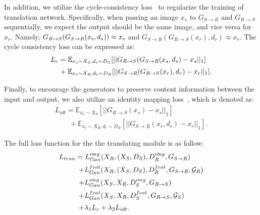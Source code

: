 \documentclass[10pt,twocolumn,letterpaper]{article}
\begin{document}
In addition, we utilize the cycle-consistency loss~\cite{zhu2017unpaired} to regularize the training of translation network. 
Specifically, when passing an image ${x_s}$ to ${G_{S \to R}}$ and ${G_{R \to S}}$ sequentially, we expect the output should be the same image, and vice versa for ${x_r}$.
Namely, ${G_{R \to S}}({G_{S \to R}}({x_{\rm{s}}},{d_s})) \approx {x_{\rm{s}}}$ and ${G_{S \to R}}({G_{R \to S}}({x_r}),{d_r}) \approx {x_r}$.  
The cycle consistency loss can be expressed as:
\begin{equation}
\label{eqn:L_c}
    \begin{array}{l}
{L_c}  = {\mathbb{E}_{{x_s} \sim {X_S},{d_s} \sim {D_S}}}[||{G_{R \to S}}({G_{S \to R}}({x_s},{d_s}) - {x_s}|{|_1}]\\ [1.8mm]
\quad \, {\rm{    }} + {\mathbb{E}_{{x_r} \sim {X_R},{d_r} \sim {D_R}}}[||{G_{S \to R}}({G_{R \to S}}({x_r}),{d_r}) - {x_r}|{|_1}].
\end{array}
\end{equation}


Finally, to encourage the generators to preserve content information between the input and output, we also utilize an identity mapping loss~\cite{zhu2017unpaired}, which is denoted as:
\begin{equation}
\label{eqn:L_i}
    \begin{array}{l}
{L_{idt}} = {\mathbb{E}_{{x_s} \sim {X_S}}}[||{G_{R \to S}}({x_s}) - {x_s}|{|_1}]\\[1.8mm]
 \quad \quad  + {\mathbb{E}_{{x_r} \sim {X_R},{d_r} \sim {D_R}}}[||{G_{S \to R}}({x_r},{d_r}) - {x_r}|{|_1}].
\end{array}
\end{equation}


The full loss function for the the translating module is as follow:
\begin{equation}
\label{eqn:Loss_trans}
    \begin{array}{l}
{L_{tran}} = L_{Gan}^{img}({X_R},({X_S},{D_S}),D_R^{img},{G_{S \to R}})\\[1.8mm]
 \quad  \quad  \ \ \, + L_{Gan}^{feat}({X_R},({X_S},{D_S}),D_R^{feat},{G_{S \to R}},{{\cal G}_{R}})\\[1.8mm]
 \quad  \quad  \ \ \, + L_{Gan}^{img}({X_S},{X_R},D_S^{img},{G_{R \to S}})\\[1.8mm]
 \quad  \quad  \ \ \, + L_{Gan}^{feat}({X_S},{X_R},D_S^{feat},{G_{R \to S}},{{\cal G}_{S}})\\[1.8mm]
 \quad  \quad  \ \ \, + {\lambda _1}{L_c} + {\lambda _2}{L_{idt}}.
\end{array}
\end{equation}
\end{document}
